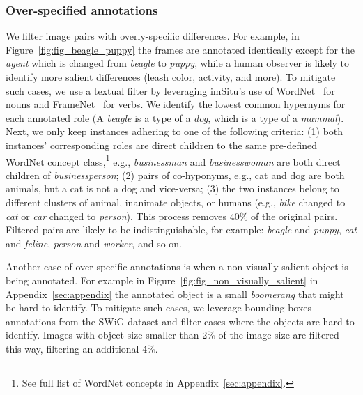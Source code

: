 \documentclass[letterpaper]{article} \usepackage{aaai23}  \usepackage{times}  \usepackage{helvet}  \usepackage{courier}  \usepackage[hyphens]{url}  \usepackage{graphicx} \urlstyle{rm} \def\UrlFont{\rm}  \usepackage{natbib}  \usepackage{caption} \frenchspacing  \setlength{\pdfpagewidth}{8.5in}  \setlength{\pdfpageheight}{11in}  \usepackage{algorithm}
\begin{document}
\subsubsection{Over-specified annotations}
We filter image pairs with overly-specific differences. For example, in Figure~\ref{fig:fig_beagle_puppy} the frames are annotated identically except for the \emph{agent} which is changed from \emph{beagle} to \emph{puppy}, while a human observer is likely to identify more salient differences (leash color, activity, and more). To mitigate such cases, we use a textual filter by leveraging imSitu's use of WordNet~\cite{miller1995wordnet} for nouns and FrameNet~\cite{fillmore2003background} for verbs. We identify the lowest common hypernyms for each annotated role (A \emph{beagle} is a type of a \emph{dog}, which is a type of a \emph{mammal}). Next, we only keep instances adhering to one of the following criteria: (1) both instances' corresponding roles are direct children to the same pre-defined WordNet concept class,\footnote{See full list of WordNet concepts in Appendix~\ref{sec:appendix}.} e.g., \emph{businessman} and \emph{businesswoman} are both direct children of \emph{businessperson}; (2) pairs of co-hyponyms, e.g., cat and dog are both animals, but a cat is not a dog and vice-versa; (3) the two instances belong to different clusters of animal, inanimate objects, or humans (e.g., \emph{bike} changed to \emph{cat} or \emph{car} changed to \emph{person}). This process removes $40\%$ of the original pairs. Filtered pairs are likely to be indistinguishable, for example: \emph{beagle} and \emph{puppy}, \emph{cat} and \emph{feline}, \emph{person} and \emph{worker}, and so on.

Another case of over-specific annotations is when a non visually salient object is being annotated. For example in Figure~\ref{fig:fig_non_visually_salient} in Appendix~\ref{sec:appendix} the annotated object is a small \emph{boomerang} that might be hard to identify. To mitigate such cases, we leverage bounding-boxes annotations from the SWiG dataset \cite{pratt2020grounded} and filter cases where the objects are hard to identify. Images with object size smaller than 2\% of the image size are filtered this way, filtering an additional 4\%.
\end{document}
